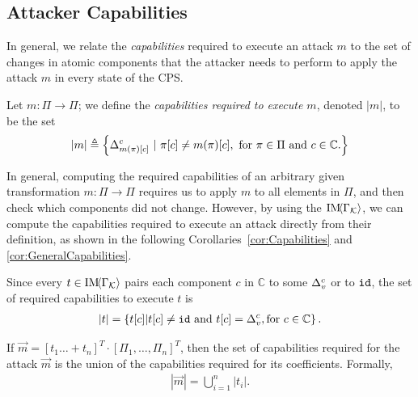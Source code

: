 {\subsection{Attacker Capabilities}
\label{sec:AttackerCapabilities}
In general, we relate the \emph{capabilities} required to execute an attack $m$ to the set of changes in atomic components that the attacker needs to perform to apply the attack $m$ in every state of the CPS.  %
\begin{definition}
Let ${m}\colon \Pi\rightarrow \Pi$; we define the \emph{capabilities required to execute $m$}, denoted $|m|$, to be the set  
\begin{align}
  |m|\triangleq \left\{{\Delta}^c_{m(\pi)[c]}\ |\ \pi[c]\neq m(\pi)[c],\text{ for $\pi\in\Pi$ and $c\in \mathbb{C}$.}\right\}
\end{align}
\end{definition}
In general, computing the required capabilities of an arbitrary given transformation $m\colon \Pi\rightarrow\Pi$ requires us to apply $m$ to all elements in $\Pi$, and then check which components did not change. However, by using the $\text{IM}\!{{\left<\Gamma_{\mathcal{K}}\right>}}$, we can compute the {capabilities} required to execute an attack directly from their definition, as shown in the following Corollaries~\ref{cor:Capabilities} and \ref{cor:GeneralCapabilities}. 

\begin{corollary}
\label{cor:Capabilities}
Since every $t\in \text{IM}\!{{\left<\Gamma_{\mathcal{K}}\right>}}$ pairs each component $c$ in $\mathbb{C}$ to some ${\Delta}^{c}_{v}$ or to ${\texttt{id}}$, 
the set of required capabilities to execute $t$ is 
\begin{align}
  |t|=\left\{t[c]| t[c]\neq {\texttt{id}} \text{ and } t[c]={\Delta}^{c}_{v}, \text{for $c\in \mathbb{C}$}\right\}.
\end{align}
\end{corollary}
\begin{corollary}
  \label{cor:GeneralCapabilities}
If $\vec{m}=[t_1\ldots + t_n]^T\cdot[\Pi_1, \ldots, \Pi_n]^T$, then the set of capabilities required for the attack $\vec{m}$ is the union of the capabilities required for its coefficients. Formally, 
\begin{align}
  |\vec{m}|=\bigcup_{i=1}^n|t_i|.
\end{align}
\end{corollary}

}
